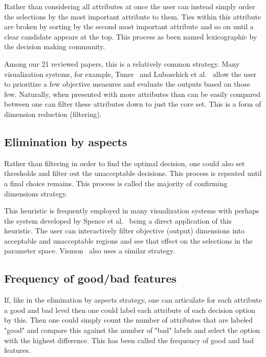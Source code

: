Rather than considering all attributes at once the user can instead simply
order the selections by the most important attribute to them. Ties within this
attribute are broken by sorting by the second most important attribute and so
on until a clear candidate appears at the top. This process as been named
lexicographic by the decision making community.

Among our 21 reviewed papers, this is a relatively common strategy.
Many visualization systems, for example, Tuner~\cite{Torsney-Weir:2011} and
Luboschick et al.~\citep{Luboschik:2014} allow the user to prioritize a few
objective measures and evaluate the outputs based on those few. Naturally,
when presented with more attributes than can be easily compared between
one can filter
these attributes down to just the core set. This is a form of dimension 
reduction (filtering).

\subsection{Elimination by aspects}\label{elimination-by-aspects}

Rather than filtering in order to find the optimal decision, one could
also set thresholds and filter out the unacceptable decisions.  This process
is repeated until a final choice remains. This process is called
the majority of confirming dimensions strategy. 

This heuristic is frequently employed in many visualization systems with
perhaps the system developed by Spence et al.~\citep{Spence:1995} being a
direct application of this heuristic. The user can interactively filter
objective (output) dimensions into acceptable and unacceptable regions and
see that effect on the selections in the parameter space. 
Vismon~\citep{Booshehrian:2012} also uses a similar strategy.

\subsection{Frequency of good/bad features}
\label{frequency-of-goodbad-features}

If, like in the elimination by aspects strategy, one can articulate for
each attribute a good and bad level then one could label each attribute
of each decision option by this. Then one could simply count the number of
attributes that are labeled "good" and compare this against the number of
"bad" labels and select the option with the highest difference. This has
been called the frequency of good and bad features.

